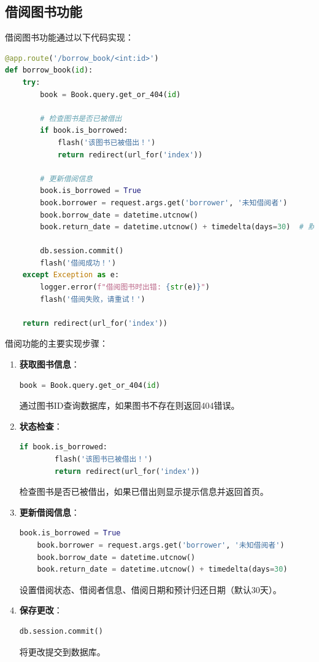 \documentclass{SYSUReport}
\begin{document}
\subsection{借阅图书功能}
借阅图书功能通过以下代码实现：

\begin{lstlisting}[language=Python]
@app.route('/borrow_book/<int:id>')
def borrow_book(id):
    try:
        book = Book.query.get_or_404(id)
        
        # 检查图书是否已被借出
        if book.is_borrowed:
            flash('该图书已被借出！')
            return redirect(url_for('index'))
        
        # 更新借阅信息
        book.is_borrowed = True
        book.borrower = request.args.get('borrower', '未知借阅者')
        book.borrow_date = datetime.utcnow()
        book.return_date = datetime.utcnow() + timedelta(days=30)  # 默认借阅30天
        
        db.session.commit()
        flash('借阅成功！')
    except Exception as e:
        logger.error(f"借阅图书时出错: {str(e)}")
        flash('借阅失败，请重试！')
    
    return redirect(url_for('index'))
\end{lstlisting}

借阅功能的主要实现步骤：

\begin{enumerate}
    \item \textbf{获取图书信息}：
    \begin{lstlisting}[language=Python]
    book = Book.query.get_or_404(id)
    \end{lstlisting}
    通过图书ID查询数据库，如果图书不存在则返回404错误。
    
    \item \textbf{状态检查}：
    \begin{lstlisting}[language=Python]
    if book.is_borrowed:
        flash('该图书已被借出！')
        return redirect(url_for('index'))
    \end{lstlisting}
    检查图书是否已被借出，如果已借出则显示提示信息并返回首页。
    
    \item \textbf{更新借阅信息}：
    \begin{lstlisting}[language=Python]
    book.is_borrowed = True
    book.borrower = request.args.get('borrower', '未知借阅者')
    book.borrow_date = datetime.utcnow()
    book.return_date = datetime.utcnow() + timedelta(days=30)
    \end{lstlisting}
    设置借阅状态、借阅者信息、借阅日期和预计归还日期（默认30天）。
    
    \item \textbf{保存更改}：
    \begin{lstlisting}[language=Python]
    db.session.commit()
    \end{lstlisting}
    将更改提交到数据库。
\end{enumerate}
\end{document}
